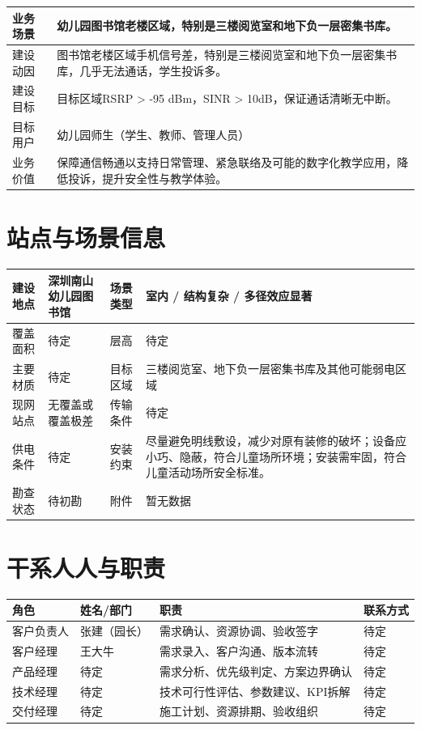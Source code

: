\documentclass[12pt,a4paper]{ctexart}
\begin{document}
\begin{tabularx}{\textwidth}{|P{3.2cm}|Y|}
\hline
业务场景 & 幼儿园图书馆老楼区域，特别是三楼阅览室和地下负一层密集书库。
 \\ \hline
建设动因 & 图书馆老楼区域手机信号差，特别是三楼阅览室和地下负一层密集书库，几乎无法通话，学生投诉多。
 \\ \hline
建设目标 & 目标区域RSRP > -95 dBm，SINR > 10dB，保证通话清晰无中断。
 \\ \hline
目标用户 & 幼儿园师生（学生、教师、管理人员）
 \\ \hline
业务价值 & 保障通信畅通以支持日常管理、紧急联络及可能的数字化教学应用，降低投诉，提升安全性与教学体验。
 \\ \hline
\end{tabularx}

\section{站点与场景信息}

\begin{tabularx}{\textwidth}{|P{3.2cm}|Y|P{3.2cm}|Y|}
\hline
建设地点 & 深圳南山幼儿园图书馆
 & 场景类型 & 室内 / 结构复杂 / 多径效应显著
 \\ \hline
覆盖面积 & 待定
 & 层高 & 待定
 \\ \hline
主要材质 & 待定
 & 目标区域 & 三楼阅览室、地下负一层密集书库及其他可能弱电区域
 \\ \hline
现网站点 & 无覆盖或覆盖极差
 & 传输条件 & 待定
 \\ \hline
供电条件 & 待定
 & 安装约束 & 尽量避免明线敷设，减少对原有装修的破坏；设备应小巧、隐蔽，符合儿童场所环境；安装需牢固，符合儿童活动场所安全标准。
 \\ \hline
勘查状态 & 待初勘
 & 附件 & 暂无数据
 \\ \hline
\end{tabularx}

\section{干系人人与职责}

\begin{tabularx}{\textwidth}{|P{3.2cm}|P{3.0cm}|Y|P{3.0cm}|}
\hline
角色 & 姓名/部门 & 职责 & 联系方式 \\
\hline
客户负责人 & 张建（园长） & 需求确认、资源协调、验收签字 & 待定
 \\ \hline
客户经理 & 王大牛 & 需求录入、客户沟通、版本流转 & 待定
 \\ \hline
产品经理 & 待定 & 需求分析、优先级判定、方案边界确认 & 待定
 \\ \hline
技术经理 & 待定 & 技术可行性评估、参数建议、KPI拆解 & 待定
 \\ \hline
交付经理 & 待定 & 施工计划、资源排期、验收组织 & 待定
 \\ \hline
\end{tabularx}
\end{document}
